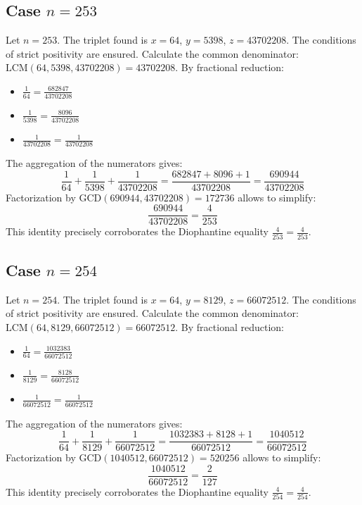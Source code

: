 \documentclass[11pt,a4paper]{article}
\begin{document}
\subsection{Case $n = 253$}
Let $n = 253$. The triplet found is $x = 64$, $y = 5398$, $z = 43702208$.
The conditions of strict positivity are ensured.
Calculate the common denominator: $\text{LCM}(64, 5398, 43702208) = 43702208$.
By fractional reduction:
\begin{itemize}
    \item $\frac{1}{64} = \frac{682847}{43702208}$
    \item $\frac{1}{5398} = \frac{8096}{43702208}$
    \item $\frac{1}{43702208} = \frac{1}{43702208}$
\end{itemize}
The aggregation of the numerators gives:
$$ \frac{1}{64} + \frac{1}{5398} + \frac{1}{43702208} = \frac{682847 + 8096 + 1}{43702208} = \frac{690944}{43702208} $$
Factorization by $\text{GCD}(690944, 43702208) = 172736$ allows to simplify:
$$ \frac{690944}{43702208} = \frac{4}{253} $$
This identity precisely corroborates the Diophantine equality $\frac{4}{253} = \frac{4}{253}$.

\subsection{Case $n = 254$}
Let $n = 254$. The triplet found is $x = 64$, $y = 8129$, $z = 66072512$.
The conditions of strict positivity are ensured.
Calculate the common denominator: $\text{LCM}(64, 8129, 66072512) = 66072512$.
By fractional reduction:
\begin{itemize}
    \item $\frac{1}{64} = \frac{1032383}{66072512}$
    \item $\frac{1}{8129} = \frac{8128}{66072512}$
    \item $\frac{1}{66072512} = \frac{1}{66072512}$
\end{itemize}
The aggregation of the numerators gives:
$$ \frac{1}{64} + \frac{1}{8129} + \frac{1}{66072512} = \frac{1032383 + 8128 + 1}{66072512} = \frac{1040512}{66072512} $$
Factorization by $\text{GCD}(1040512, 66072512) = 520256$ allows to simplify:
$$ \frac{1040512}{66072512} = \frac{2}{127} $$
This identity precisely corroborates the Diophantine equality $\frac{4}{254} = \frac{4}{254}$.
\end{document}
